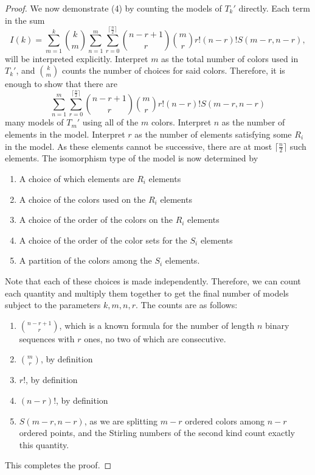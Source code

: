 \documentclass[11pt]{amsart}
\theoremstyle{definition}
\begin{document}
\begin{proof}
    We now demonstrate (4) by counting the models of $T_k'$ directly.
    Each term in the sum
    \[I(k)=\sum_{m=1}^k{k \choose m}\sum_{n=1}^m\sum_{r=0}^{\lceil \frac{n}2 \rceil}{n-r+1 \choose r}{m \choose r}r!(n-r)!S(m-r,n-r),\]
    will be interpreted explicitly.
    Interpret $m$ as the total number of colors used in $T_k'$, and ${k \choose m}$ counts the number of choices for said colors.
    Therefore, it is enough to show that there are
    \[\sum_{n=1}^m\sum_{r=0}^{\lceil \frac{n}2 \rceil}{n-r+1 \choose r}{m \choose r}r!(n-r)!S(m-r,n-r)\]
    many models of $T_m'$ using all of the $m$ colors.
    Interpret $n$ as the number of elements in the model.
    Interpret $r$ as the number of elements satisfying some $R_i$ in the model.
    As these elements cannot be successive, there are at most $\lceil \frac{n}2 \rceil$ such elements.
    The isomorphism type of the model is now determined by
    \begin{enumerate}
        \item A choice of which elements are $R_i$ elements
        \item A choice of the colors used on the $R_i$ elements
        \item A choice of the order of the colors on the $R_i$ elements
        \item A choice of the order of the color sets for the $S_i$ elements
        \item A partition of the colors among the $S_i$ elements.
    \end{enumerate}
    Note that each of these choices is made independently.
    Therefore, we can count each quantity and multiply them together to get the final number of models subject to the parameters $k,m,n,r$.
    The counts are as follows:
    \begin{enumerate}
        \item ${n-r+1 \choose r}$, which is a known formula for the number of length $n$ binary sequences with $r$ ones, no two of which are consecutive.
        \item ${m \choose r}$, by definition
        \item $r!$, by definition
        \item $(n-r)!$, by definition
        \item $S(m-r,n-r)$, as we are splitting $m-r$ ordered colors among $n-r$ ordered points, and the Stirling numbers of the second kind count exactly this quantity.
    \end{enumerate}
    This completes the proof.
\end{proof}
\end{document}
